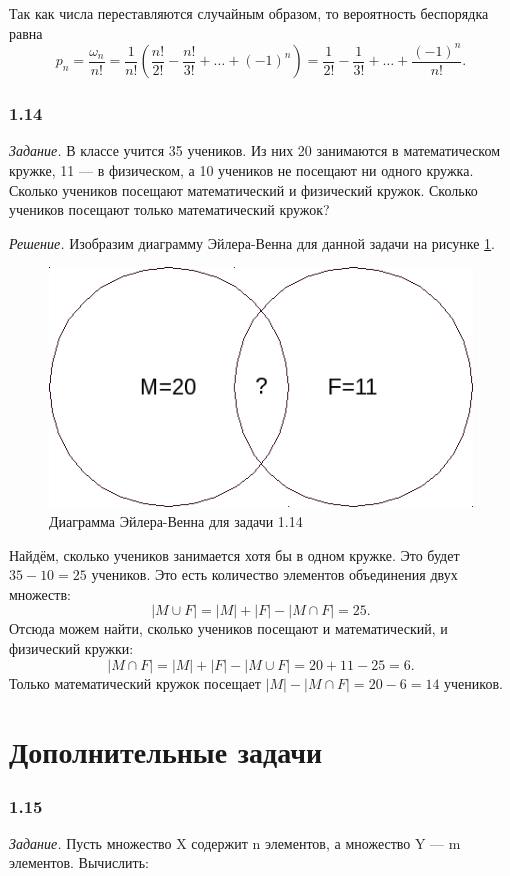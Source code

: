 \documentclass{book}
\begin{document}
Так как числа переставляются случайным образом, то вероятность беспорядка равна $$p_n=\frac{\omega_n}{n!}=\frac{1}{n!}\left(\frac{n!}{2!}-\frac{n!}{3!}+ \dotsc +\left(-1\right)^n\right)=\frac{1}{2!}-\frac{1}{3!}+ \dotsc +\frac{\left(-1\right)^n}{n!}.$$

\subsubsection*{1.14}

\textit{Задание.} В классе учится 35 учеников. Из них 20 занимаются в математическом кружке, 11 --- в физическом, а 10 учеников не посещают ни одного кружка. Сколько учеников посещают математический и физический кружок. Сколько учеников посещают только математический кружок?

\textit{Решение.} Изобразим диаграмму Эйлера-Венна для данной задачи на рисунке \ref{fig:114}. 

\begin{figure}[h!]
  \centering
  \includegraphics[width=.4\textwidth]{./pictures/1_14.png}
  \caption{Диаграмма Эйлера-Венна для задачи 1.14}
  \label{fig:114}
\end{figure}

Найдём, сколько учеников занимается хотя бы в одном кружке. Это будет $35-10=25$ учеников. Это есть количество элементов объединения двух множеств: $$|M\cup F|=|M|+|F|-|M\cap F|=25.$$ Отсюда можем найти, сколько учеников посещают и математический, и физический кружки: $$|M\cap F|=|M|+|F|-|M\cup F|=20+11-25=6.$$ Только математический кружок посещает $|M|-|M\cap F|=20-6=14$ учеников.

\section*{Дополнительные задачи}

\subsubsection*{1.15}

\textit{Задание.} Пусть множество X содержит n элементов, а множество Y --- m элементов. Вычислить:
\end{document}
